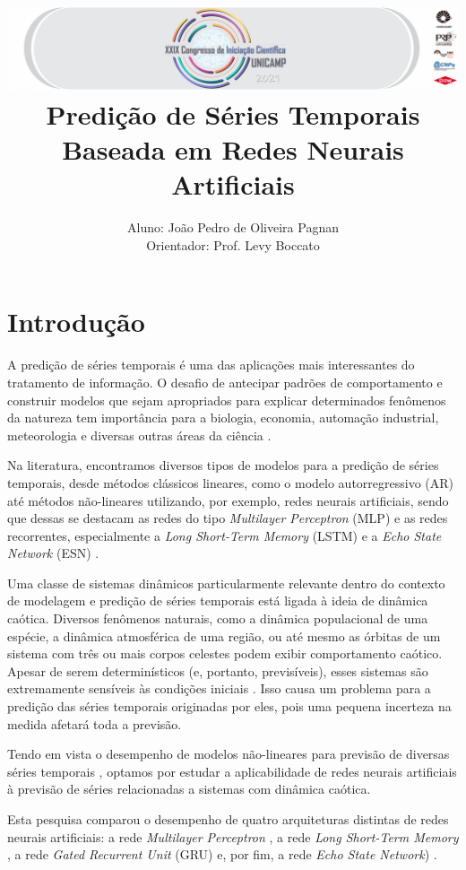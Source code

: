 \documentclass[10pt, technote]{article}
\title{{\noindent \includegraphics[scale = 0.5]{banner-grande.png}}\\ Predição de Séries Temporais Baseada em Redes Neurais
Artificiais}
\author{Aluno: João Pedro de Oliveira Pagnan\\Orientador: Prof.  Levy Boccato}
\begin{document}

\section{Introdução}

A predição de séries temporais é uma das aplicações mais interessantes do tratamento de informação. O desafio de antecipar padrões de comportamento e construir modelos que sejam apropriados para explicar determinados fenômenos da natureza tem importância  para a biologia, economia, automação industrial, meteorologia e diversas outras áreas da ciência \cite{box2015time}.

Na literatura, encontramos diversos tipos de modelos para a  predição de séries temporais, desde métodos clássicos lineares, como o modelo autorregressivo (AR) \cite{box2015time} até métodos não-lineares utilizando, por exemplo, redes neurais artificiais, sendo que dessas se destacam as redes do tipo \textit{Multilayer Perceptron} (MLP) \cite{rosenblatt1958perceptron} e as redes recorrentes, especialmente a \textit{Long Short-Term Memory} (LSTM)  \cite{connor1994recurrent} e a \textit{Echo State Network} (ESN) \cite{jaeger2007echo}.

Uma classe de sistemas dinâmicos particularmente relevante dentro do contexto de modelagem e predição de séries temporais está ligada à ideia de dinâmica caótica. Diversos fenômenos naturais, como a dinâmica populacional de uma espécie, a dinâmica atmosférica de uma região, ou até mesmo as órbitas de um sistema com três ou mais corpos celestes podem exibir comportamento caótico. Apesar de serem determinísticos (e, portanto, previsíveis), esses sistemas são extremamente sensíveis às condições iniciais \cite{fiedler1994caos}. Isso causa um problema para a predição das séries temporais originadas por eles, pois uma pequena incerteza na medida afetará toda a previsão. 

Tendo em vista o desempenho de modelos não-lineares para previsão de diversas séries temporais \cite{connor1994recurrent}, optamos por estudar a aplicabilidade de redes neurais artificiais à previsão de séries relacionadas a sistemas com dinâmica caótica.

Esta pesquisa comparou o desempenho de quatro arquiteturas distintas de redes neurais artificiais: a rede \textit{Multilayer Perceptron} \cite{rosenblatt1958perceptron}, a rede \textit{Long Short-Term Memory} \cite{connor1994recurrent}, a rede \textit{Gated Recurrent Unit} (GRU) \cite{cho2014learning} e, por fim, a rede \textit{Echo State Network}) \cite{jaeger2007echo}.
\end{document}
